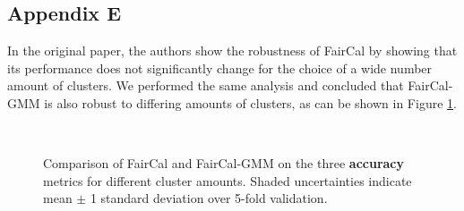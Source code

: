 \subsection{Appendix E}
In the original paper, the authors show the robustness of FairCal by showing that its performance does not significantly change for the choice of a wide number amount of clusters. We performed the same analysis and concluded that FairCal-GMM is also robust to differing amounts of clusters, as can be shown in Figure \ref{fig:test}.
\begin{figure}[h]
\centering
    \hspace{3pt}
 \\
\caption{Comparison of FairCal and FairCal-GMM on the three \textcolor{Emerald}{\textbf{accuracy}} metrics for different cluster amounts. Shaded uncertainties indicate mean $\pm$ 1 standard deviation over 5-fold validation.} 
\label{fig:test}
\end{figure}
